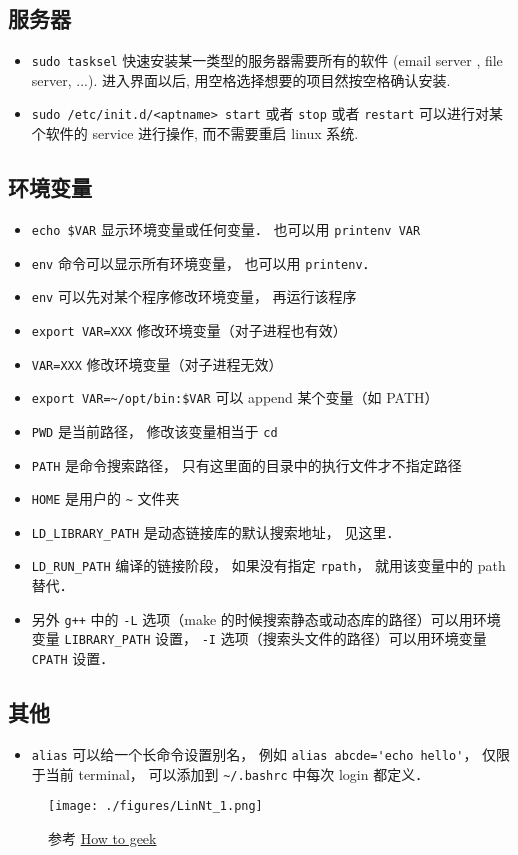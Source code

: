 \subsection{服务器}
\begin{itemize}
\item \verb`sudo tasksel` 快速安装某一类型的服务器需要所有的软件 (email server , file server, ...). 进入界面以后, 用空格选择想要的项目然按空格确认安装.
\item \verb`sudo /etc/init.d/<aptname> start` 或者 \verb`stop` 或者 \verb`restart` 可以进行对某个软件的 service 进行操作, 而不需要重启 linux 系统.
\end{itemize}

\subsection{环境变量}
\begin{itemize}
\item \verb|echo $VAR| 显示环境变量或任何变量． 也可以用 \verb|printenv VAR|
\item \verb|env| 命令可以显示所有环境变量， 也可以用 \verb|printenv|．
\item \verb|env| 可以先对某个程序修改环境变量， 再运行该程序
\item \verb|export VAR=XXX| 修改环境变量（对子进程也有效）
\item \verb|VAR=XXX| 修改环境变量（对子进程无效）
\item \verb|export VAR=~/opt/bin:$VAR| 可以 append 某个变量（如 PATH）
\item \verb|PWD| 是当前路径， 修改该变量相当于 \verb|cd|
\item \verb|PATH| 是命令搜索路径， 只有这里面的目录中的执行文件才不指定路径
\item \verb|HOME| 是用户的 \verb|~| 文件夹
\item \verb|LD_LIBRARY_PATH| 是动态链接库的默认搜索地址， 见这里．
\item \verb|LD_RUN_PATH| 编译的链接阶段， 如果没有指定 \verb|rpath|， 就用该变量中的 path 替代．
\item 另外 \verb|g++| 中的 \verb|-L| 选项（make 的时候搜索静态或动态库的路径）可以用环境变量 \verb|LIBRARY_PATH| 设置， \verb|-I| 选项（搜索头文件的路径）可以用环境变量 \verb|CPATH| 设置．
\end{itemize}

\subsection{其他}
\begin{itemize}
\item \verb`alias` 可以给一个长命令设置别名， 例如 \verb|alias abcde='echo hello'|， 仅限于当前 terminal， 可以添加到 \verb|~/.bashrc| 中每次 login 都定义．
\end{itemize}


\begin{figure}[ht]
\centering
\texttt{[image: ./figures/LinNt\_1.png]}
\caption{参考 \href{https://www.howtogeek.com/}{How to geek}} \label{LinNt_fig1}
\end{figure}
